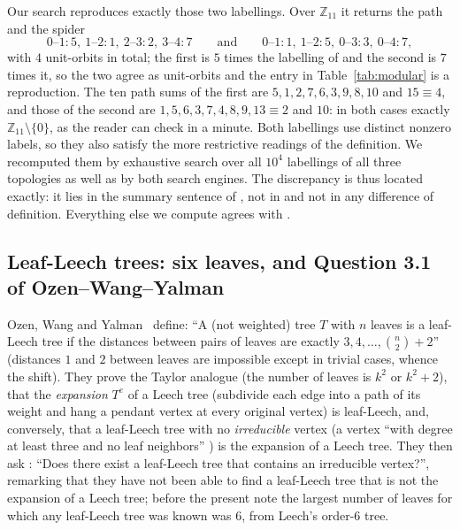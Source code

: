\documentclass[11pt,a4paper]{article}
\theoremstyle{plain}
\theoremstyle{remark}
\newcommand{\Z}{\mathbb{Z}}
\newcommand{\bin}[2]{\binom{#1}{#2}}
\begin{document}
Our search reproduces exactly those two labellings.  Over $\Z_{11}$ it returns
the path and the spider
\[
  0\text{--}1{:}5,\ 1\text{--}2{:}1,\ 2\text{--}3{:}2,\ 3\text{--}4{:}7
  \qquad\text{and}\qquad
  0\text{--}1{:}1,\ 1\text{--}2{:}5,\ 0\text{--}3{:}3,\ 0\text{--}4{:}7 ,
\]
with $4$ unit-orbits in total; the first is $5$ times the labelling of
\cite[Lem.~4.2]{LeachWalsh2011} and the second is $7$ times it, so the two
agree as unit-orbits and the entry in Table~\ref{tab:modular} is a
reproduction.  The ten path sums of the first are
$5,1,2,7,6,3,9,8,10$ and $15\equiv 4$, and those of the second are
$1,5,6,3,7,4,8,9,13\equiv 2$ and $10$: in both cases exactly
$\Z_{11}\setminus\{0\}$, as the reader can check in a minute.  Both labellings
use distinct nonzero labels, so they also satisfy the more restrictive readings
of the definition.  We recomputed them by
exhaustive search over all $10^4$ labellings of all three topologies as well as
by both search engines.  The discrepancy is thus located exactly: it lies in the
summary sentence of \cite{Leach2014}, not in \cite{LeachWalsh2011} and not in
any difference of definition.  Everything else we compute agrees with
\cite{Leach2014}.

\subsection{Leaf-Leech trees: six leaves, and Question 3.1 of Ozen--Wang--Yalman}
\label{sec:leafleech}

Ozen, Wang and Yalman~\cite{OzenWangYalman2016} define: ``A (not weighted) tree
$T$ with $n$ leaves is a leaf-Leech tree if the distances between pairs of leaves
are exactly $3,4,\dots,\bin n2+2$'' \cite[Def.~1]{OzenWangYalman2016} (distances
$1$ and $2$ between leaves are impossible except in trivial cases, whence the
shift).  They prove the Taylor analogue (the number of leaves is $k^2$ or
$k^2+2$), that the \emph{expansion} $T^e$ of a Leech tree (subdivide each edge
into a path of its weight and hang a pendant vertex at every original
vertex) is leaf-Leech, and, conversely, that a leaf-Leech tree with no
\emph{irreducible} vertex (a vertex ``with degree at least three and no leaf
neighbors'' \cite[p.~4]{OzenWangYalman2016}) is the expansion of a Leech tree.
They then ask \cite[Question 3.1]{OzenWangYalman2016}: ``Does there exist a
leaf-Leech tree that contains an irreducible vertex?'', remarking that they have
not been able to find a leaf-Leech tree that is not the expansion of a Leech
tree; before the present note the largest number of leaves for which any
leaf-Leech tree was known was $6$, from Leech's order-$6$ tree.
\end{document}
